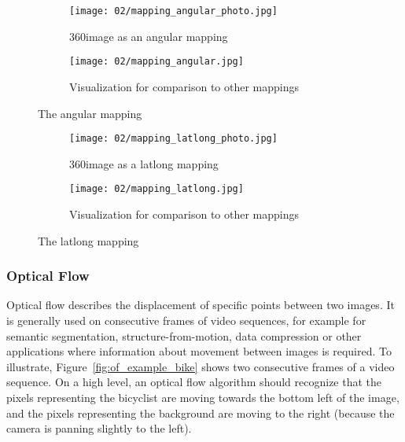 \begin{figure}
    \quad
    \begin{subfigure}[t]{0.5\textwidth}            
            \centering
            \texttt{[image: 02/mapping\_angular\_photo.jpg]}
            \caption{360\degree image as an angular mapping}
    \end{subfigure}%
    \begin{subfigure}[t]{0.5\textwidth}
            \centering
            \texttt{[image: 02/mapping\_angular.jpg]}
            \caption{Visualization for comparison to other mappings}
    \end{subfigure}
    \caption[Angular mapping]{The angular mapping}\label{fig:angular-intro}

    \quad
    \begin{subfigure}[t]{0.5\textwidth} 
            \centering
            \texttt{[image: 02/mapping\_latlong\_photo.jpg]}
            \caption{360\degree image as a latlong mapping}
    \end{subfigure}%
    \begin{subfigure}[t]{0.5\textwidth}
            \centering
            \texttt{[image: 02/mapping\_latlong.jpg]}
            \caption{Visualization for comparison to other mappings}
    \end{subfigure}
    \caption[Latlong mapping]{The latlong mapping}\label{fig:latlong-intro}
  \end{figure}


\subsubsection{Optical Flow}
Optical flow describes the displacement of specific points between two images. It is generally used on consecutive frames of video sequences, for example for semantic segmentation, structure-from-motion, data compression or other applications where information about movement between images is required. To illustrate, Figure~\ref{fig:of_example_bike} shows two consecutive frames of a video sequence. On a high level, an optical flow algorithm should recognize that the pixels representing the bicyclist are moving towards the bottom left of the image, and the pixels representing the background are moving to the right (because the camera is panning slightly to the left).

